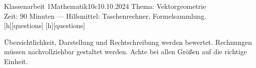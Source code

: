 \documentclass[12pt,fleqn,a4paper]{../exam2e}
\begin{document}
\thispagestyle{empty}%

\begin{klassenarbeitskopf}{Klassenarbeit 1}{Mathematik}{10c}{10.10.2024}
	Thema: Vektorgeometrie\\
	Zeit: 90 Minuten --- Hilfsmittel: Taschenrechner, Formelsammlung.\\[1ex]
	\small
	[questions] 
	[questions] \\
\end{klassenarbeitskopf}

\vspace*{1.5ex}
Übersichtlichkeit, Darstellung und Rechtschreibung werden bewertet.
Rechnungen müssen nachvollziehbar gestaltet werden. 
Achte bei allen Größen auf die richtige Einheit.
\end{document}
